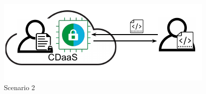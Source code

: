 \begin{figure}[htbp]
\centerline{\includegraphics[scale=0.72]{figures/fg-scenario-2.pdf}}
\caption{Scenario 2}\label{fg-scenario_2}
\end{figure}